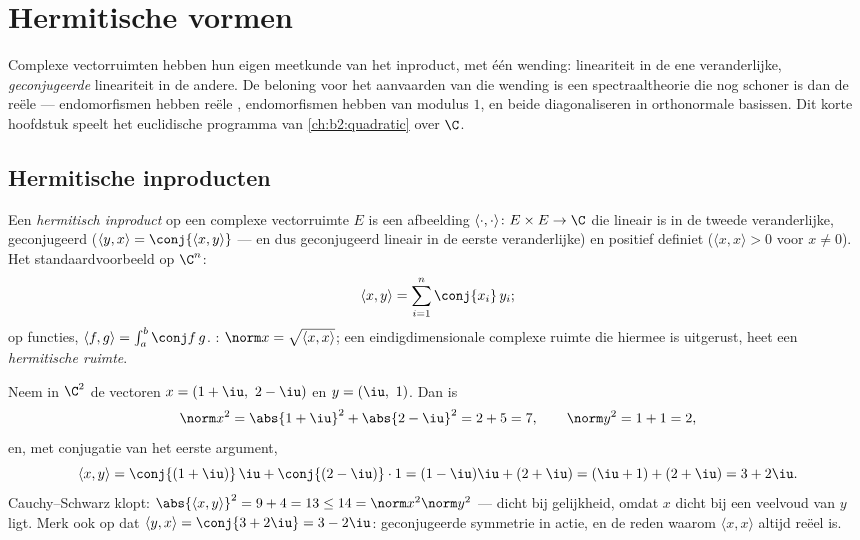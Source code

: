 \chapter{Hermitische vormen}\label{ch:b2:hermitian}

Complexe vectorruimten hebben hun eigen meetkunde van het
inproduct, met één wending: lineariteit in de ene veranderlijke,
\emph{geconjugeerde} lineariteit in de andere. De beloning voor het
aanvaarden van die wending is een spectraaltheorie die nog schoner
is dan de reële ---  endomorfismen hebben reële
,  endomorfismen hebben  van
modulus $1$, en beide diagonaliseren in orthonormale basissen. Dit
korte hoofdstuk speelt het euclidische programma van
\cref{ch:b2:quadratic} over $\C$.

\section{Hermitische inproducten}

\begin{definition}\label{def:b2:hermitian:def}
Een \emph{hermitisch inproduct} op een
complexe vectorruimte $E$ is een afbeelding
$\langle\cdot,\cdot\rangle \colon E \times E \to \C$ die lineair is
in de tweede veranderlijke, geconjugeerd  ($\langle y,
x\rangle = \conj{\langle x, y\rangle}$ --- en dus geconjugeerd
lineair in de eerste veranderlijke) en positief definiet ($\langle
x, x\rangle > 0$ voor $x \neq 0$). Het standaardvoorbeeld op
$\C^n$:
\[
\langle x, y \rangle = \sum_{i=1}^{n} \conj{x_i}\, y_i ;
\]
op  functies, $\langle f, g\rangle = \int_a^b \conj
f\,g$. : $\norm x = \sqrt{\langle x,x\rangle}$; een
eindigdimensionale complexe ruimte die hiermee is uitgerust, heet
een \emph{hermitische ruimte}.
\end{definition}

\begin{example}\label{ex:b2:hermitian:firstcomp}
Neem in $\C^2$ de vectoren $x = (1+\iu,\ 2-\iu)$ en $y = (\iu,\
1)$. Dan is
\[
\norm x^2 = \abs{1+\iu}^2 + \abs{2-\iu}^2 = 2 + 5 = 7,
\qquad
\norm y^2 = 1 + 1 = 2,
\]
en, met conjugatie van het eerste argument,
\[
\langle x, y\rangle
= \conj{(1+\iu)}\,\iu + \conj{(2-\iu)}\cdot1
= (1-\iu)\iu + (2+\iu)
= (\iu + 1) + (2 + \iu) = 3 + 2\iu .
\]
Cauchy--Schwarz klopt: $\abs{\langle x, y\rangle}^2 = 9 + 4 = 13
\leq 14 = \norm x^2\norm y^2$ --- dicht bij gelijkheid, omdat $x$
dicht bij een veelvoud van $y$ ligt. Merk ook op dat $\langle y,
x\rangle = \conj{3 + 2\iu} = 3 - 2\iu$: geconjugeerde symmetrie in
actie, en de reden waarom $\langle x, x\rangle$ altijd reëel is.
\end{example}

